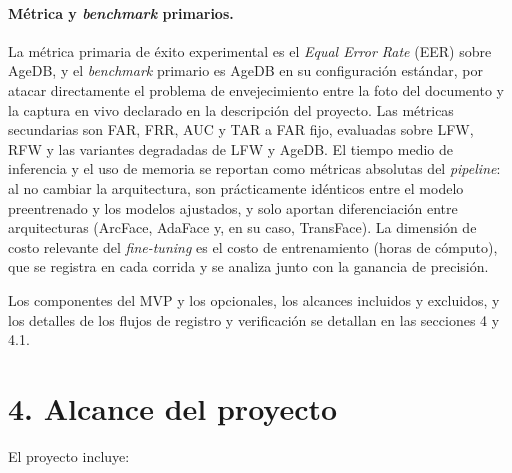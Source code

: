\documentclass[
  11pt, %
]{charter}
\begin{document}
\paragraph{Métrica y \textit{benchmark} primarios.}
La métrica primaria de éxito experimental es el \textit{Equal Error Rate} (EER) sobre AgeDB, y el \textit{benchmark} primario es AgeDB en su configuración estándar, por atacar directamente el problema de envejecimiento entre la foto del documento y la captura en vivo declarado en la descripción del proyecto. Las métricas secundarias son FAR, FRR, AUC y TAR a FAR fijo, evaluadas sobre LFW, RFW y las variantes degradadas de LFW y AgeDB. El tiempo medio de inferencia y el uso de memoria se reportan como métricas absolutas del \textit{pipeline}: al no cambiar la arquitectura, son prácticamente idénticos entre el modelo preentrenado y los modelos ajustados, y solo aportan diferenciación entre arquitecturas (ArcFace, AdaFace y, en su caso, TransFace). La dimensión de costo relevante del \textit{fine-tuning} es el costo de entrenamiento (horas de cómputo), que se registra en cada corrida y se analiza junto con la ganancia de precisión.

Los componentes del MVP y los opcionales, los alcances incluidos y excluidos, y los detalles de los flujos de registro y verificación se detallan en las secciones 4 y 4.1.

\section{4. Alcance del proyecto}
\label{sec:alcance}

El proyecto incluye:
\end{document}
